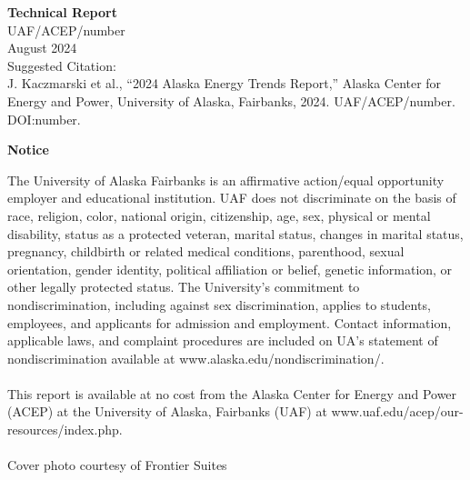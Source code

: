 \newpage
\noindent
{\normalsize\bfseries Technical Report} \\
UAF/ACEP/number \\ 
\vspace{3ex}
August 2024 \\
Suggested Citation: \\
J. Kaczmarski et al., “2024 Alaska Energy Trends Report,” Alaska Center for Energy and Power, University of Alaska, Fairbanks, 2024. UAF/ACEP/number. DOI:number. 

\newpage
\noindent
{\centering
\bfseries\normalsize Notice
\par
}
\small The University of Alaska Fairbanks is an affirmative action/equal opportunity employer and educational institution. UAF does not discriminate on the basis of race, religion, color, national origin, citizenship, age, sex, physical or mental disability, status as a protected veteran, marital status, changes in marital status, pregnancy, childbirth or related medical conditions, parenthood, sexual orientation, gender identity, political affiliation or belief, genetic information, or other legally protected status. The University's commitment to nondiscrimination, including against sex discrimination, applies to students, employees, and applicants for admission and employment. Contact information, applicable laws, and complaint procedures are included on UA's statement of nondiscrimination available at www.alaska.edu/nondiscrimination/. \\
\\
\small This report is available at no cost from the Alaska Center for Energy and Power (ACEP) at the University of Alaska, Fairbanks (UAF) at www.uaf.edu/acep/our-resources/index.php. \\
\\
\small Cover photo courtesy of Frontier Suites